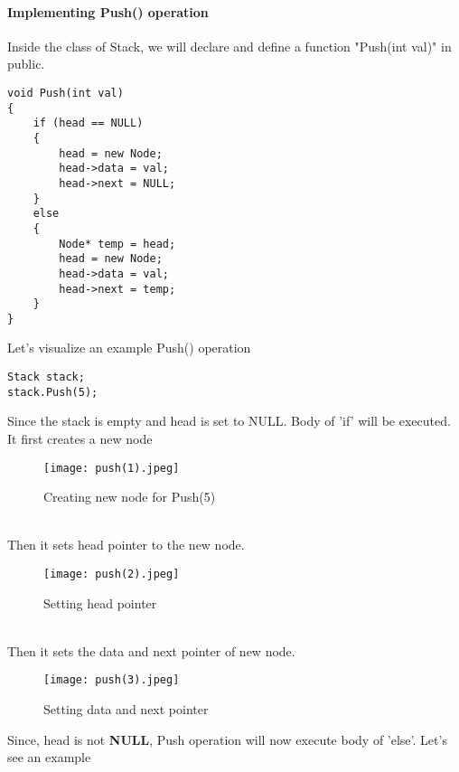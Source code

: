 \documentclass[11pt,fleqn]{book} %
\begin{document}
\paragraph{Implementing Push() operation}
Inside the class of Stack, we will declare and define a function "Push(int val)" in public.
\begin{lstlisting}
void Push(int val)
{
	if (head == NULL)
	{
		head = new Node;
		head->data = val;
		head->next = NULL;
	}
	else
	{
		Node* temp = head;
		head = new Node;
		head->data = val;
		head->next = temp;
	}
}
\end{lstlisting}
\newpage
\begin{example}
Let's visualize an example Push() operation\\
\begin{lstlisting}
Stack stack;
stack.Push(5);
\end{lstlisting}
Since the stack is empty and head is set to NULL. Body of 'if' will be executed.\\
It first creates a new node\\
\begin{figure}[H]
	\centering
	\texttt{[image: push(1).jpeg]}
	\caption{Creating new node for Push(5)}
\end{figure}
~\\
Then it sets head pointer to the new node.
\begin{figure}[H]
	\centering
	\texttt{[image: push(2).jpeg]}
	\caption{Setting head pointer}
\end{figure}
~\\
Then it sets the data and next pointer of new node.
\begin{figure}[H]
	\centering
	\texttt{[image: push(3).jpeg]}
	\caption{Setting data and next pointer}
\end{figure}
\end{example}
\newpage
Since, head is not \textbf{NULL}, Push operation will now execute body of 'else'. Let's see an example
\end{document}
